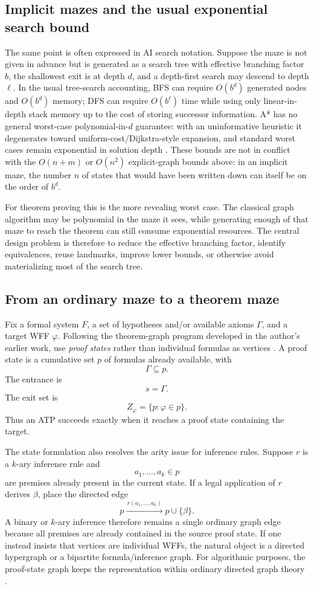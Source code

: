 \subsection{Implicit mazes and the usual exponential search bound}
The same point is often expressed in AI search notation. Suppose the maze is not given in advance but is generated as a search tree with effective branching factor $b$, the shallowest exit is at depth $d$, and a depth-first search may descend to depth $\ell$. In the usual tree-search accounting, BFS can require $O(b^d)$ generated nodes and $O(b^d)$ memory; DFS can require $O(b^{\ell})$ time while using only linear-in-depth stack memory up to the cost of storing successor information. A* has no general worst-case polynomial-in-$d$ guarantee: with an uninformative heuristic it degenerates toward uniform-cost/Dijkstra-style expansion, and standard worst cases remain exponential in solution depth \cite{aima,astar}. These bounds are not in conflict with the $O(n+m)$ or $O(n^2)$ explicit-graph bounds above: in an implicit maze, the number $n$ of states that would have been written down can itself be on the order of $b^d$.

For theorem proving this is the more revealing worst case. The classical graph algorithm may be polynomial in the maze it sees, while generating enough of that maze to reach the theorem can still consume exponential resources. The central design problem is therefore to reduce the effective branching factor, identify equivalences, reuse landmarks, improve lower bounds, or otherwise avoid materializing most of the search tree.

\subsection{From an ordinary maze to a theorem maze}
Fix a formal system $F$, a set of hypotheses and/or available axioms $\Gamma$, and a target WFF $\varphi$. Following the theorem-graph program developed in the author's earlier work, use \emph{proof states} rather than individual formulas as vertices \cite{depths}. A proof state is a cumulative set $p$ of formulas already available, with
\[
\Gamma\subseteq p.
\]
The entrance is
\[
s=\Gamma.
\]
The exit set is
\[
Z_\varphi=\{p:\varphi\in p\}.
\]
Thus an ATP succeeds exactly when it reaches a proof state containing the target.

The state formulation also resolves the arity issue for inference rules. Suppose $r$ is a $k$-ary inference rule and
\[
a_1,\ldots,a_k\in p
\]
are premises already present in the current state. If a legal application of $r$ derives $\beta$, place the directed edge
\[
p\xrightarrow{\,r(a_1,\ldots,a_k)\,}p\cup\{\beta\}.
\]
A binary or $k$-ary inference therefore remains a single ordinary graph edge because all premises are already contained in the source proof state. If one instead insists that vertices are individual WFFs, the natural object is a directed hypergraph or a bipartite formula/inference graph. For algorithmic purposes, the proof-state graph keeps the representation within ordinary directed graph theory \cite{depths}.

